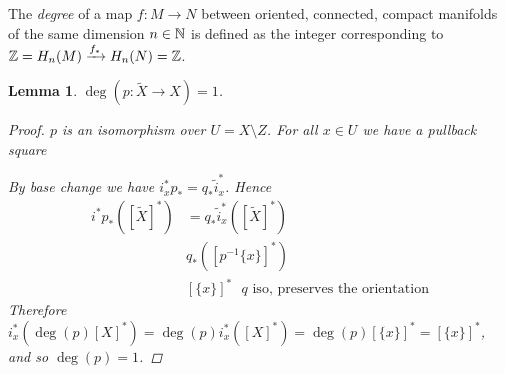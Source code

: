 \documentclass[A4paper, british]{amsart}
\theoremstyle{darkgreentheorem}
\newtheorem{lm}[thm]{Lemma}
\theoremstyle{darkbluedefinition}
\theoremstyle{darkredexample}
\theoremstyle{remark}
\newcommand{\1}{\mathbbm{1}}
\begin{document}
The \textit{degree} of a map $f\colon M\to N$ between oriented, connected, compact manifolds of the same dimension $n\in \mathbb{N}$ is defined as the integer corresponding to $\mathbb{Z}=H_{n}(M)\xrightarrow{f_{*}} H_{n}(N)=\mathbb{Z}$.

\begin{lm}
    $\deg(p\colon \tilde{X}\to X)=1$.
    \begin{proof}
	$p$ is an isomorphism over $U=X\setminus Z$.
	For all $x\in U$ we have a pullback square
	\begin{center}
	\end{center}
	By base change we have $i_{x}^{*}p_{*}=q_{*}\tilde{i}_{x}^{*}$.
	Hence
	\begin{align*}
	    i^{*}p_{*}([\tilde{X}]^{*}) & =q_{*}\tilde{i}_{x}^{*}([\tilde{X}]^{*}) \\
	     & q_{*}([p^{-1}\{x\}]^{*}) \\
	     & [\{x\}]^{*} \text{ $q$ iso, preserves the orientation}
	\end{align*}
	Therefore $i_{x}^{*}(\deg(p)[X]^{*})=\deg(p)i_{x}^{*}([X]^{*})=\deg(p)[\{x\}]^{*}=[\{x\}]^{*}$, and so $\deg(p)=1$.
    \end{proof}
\end{lm}
\end{document}
